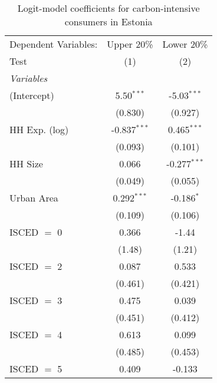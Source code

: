 
\begin{table}[htbp!]
   \centering
   \small
   \begin{adjustbox}{width = 1\textwidth, max height = 0.95\textheight, center}
      \begin{threeparttable}[b]
         \caption{\label{tab:Logit_1_EST} Logit-model coefficients for carbon-intensive consumers in Estonia}
         \begin{tabular}{lcc}
            \tabularnewline \midrule \midrule
            Dependent Variables: & Upper 20\%     & Lower 20\%\\   
            Test                 & (1)            & (2)\\  
            \midrule
            \emph{Variables}\\
            (Intercept)          & 5.50$^{***}$   & -5.03$^{***}$\\   
                                 & (0.830)        & (0.927)\\   
            HH Exp. (log)        & -0.837$^{***}$ & 0.465$^{***}$\\   
                                 & (0.093)        & (0.101)\\   
            HH Size              & 0.066          & -0.277$^{***}$\\   
                                 & (0.049)        & (0.055)\\   
            Urban Area           & 0.292$^{***}$  & -0.186$^{*}$\\   
                                 & (0.109)        & (0.106)\\   
            ISCED $=$ 0          & 0.366          & -1.44\\   
                                 & (1.48)         & (1.21)\\   
            ISCED $=$ 2          & 0.087          & 0.533\\   
                                 & (0.461)        & (0.421)\\   
            ISCED $=$ 3          & 0.475          & 0.039\\   
                                 & (0.451)        & (0.412)\\   
            ISCED $=$ 4          & 0.613          & 0.099\\   
                                 & (0.485)        & (0.453)\\   
            ISCED $=$ 5          & 0.409          & -0.133\\   

\end{tabular}
\end{threeparttable}
\end{adjustbox}
\end{table}
